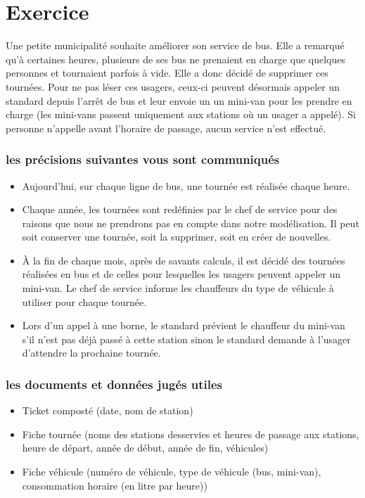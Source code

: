 \section*{Exercice}
Une petite municipalité souhaite améliorer son service de bus. Elle a remarqué qu'à certaines heures, plusieurs de ses bus ne prenaient en charge que quelques personnes et tournaient parfois à vide. Elle a donc décidé de supprimer ces tournées. Pour ne pas léser ces usagers, ceux-ci peuvent désormais appeler un standard depuis l'arrêt de bus et leur envoie un un mini-van pour les prendre en charge (les mini-vans passent uniquement aux stations où un usager a appelé). Si personne n'appelle avant l'horaire de passage, aucun service n'est effectué.

\subsubsection*{les précisions suivantes vous sont communiqués}
\begin{itemize}
    \item Aujourd'hui, sur chaque ligne de bus, une tournée est réalisée chaque heure.
    \item Chaque année, les tournées sont redéfinies par le chef de service pour des raisons que nous ne prendrons pas en compte dans notre modélisation. Il peut soit conserver une tournée, soit la supprimer, soit en créer de nouvelles.
    \item À la fin de chaque mois, après de savants calculs, il est décidé des tournées réalisées en bus et de celles pour lesquelles les usagers peuvent appeler un mini-van. Le chef de service informe les chauffeurs du type de véhicule à utiliser pour chaque tournée.
    \item Lors d'un appel à une borne, le standard prévient le chauffeur du mini-van s'il n'est pas déjà passé à cette station sinon le standard demande à l'usager d'attendre la prochaine tournée.
\end{itemize}

\subsubsection*{les documents et données jugés utiles}
\begin{itemize}
    \item Ticket composté (date, nom de station)
    \item Fiche tournée (noms des stations desservies et heures de passage aux stations, heure de départ, année de début, année de fin, véhicules)
    \item Fiche véhicule (numéro de véhicule, type de véhicule (bus, mini-van), consommation horaire (en litre par heure))
\end{itemize}

